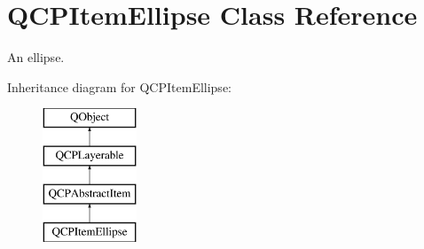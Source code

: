 \hypertarget{classQCPItemEllipse}{}\section{Q\+C\+P\+Item\+Ellipse Class Reference}
\label{classQCPItemEllipse}


An ellipse.  


Inheritance diagram for Q\+C\+P\+Item\+Ellipse\+:\begin{figure}[H]
\begin{center}
\leavevmode
\includegraphics[height=4.000000cm]{classQCPItemEllipse}
\end{center}
\end{figure}
